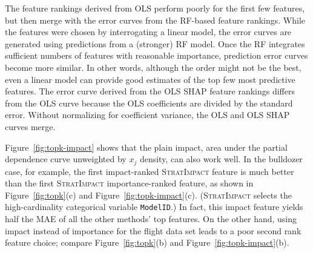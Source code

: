 \documentclass[11pt]{article}
\newcommand{\figref}[1]{Figure~\ref{#1}}
\newcommand{\simp}{\fontfamily{cmr}\textsc{\small StratImpact}}
\begin{document}
The feature rankings derived from OLS perform poorly for the first few features, but then merge with the error curves from the RF-based feature rankings.  While the features were chosen by interrogating a linear model, the error curves are generated using predictions from a (stronger) RF model. Once the RF integrates sufficient numbers of features with reasonable importance, prediction error curves become more similar.  In other words, although the order might not be the best, even a linear model can provide good estimates of the top few most  predictive features. The error curve derived from the OLS SHAP feature rankings differs from the OLS curve because the OLS coefficients are divided by the standard error. Without normalizing for coefficient variance, the OLS and OLS SHAP curves merge.

\figref{fig:topk-impact} shows that the plain impact, area under the partial dependence curve unweighted by $x_j$ density, can also work well.  In the bulldozer case, for example, the first impact-ranked \simp{} feature is much better than the first \simp{} importance-ranked feature, as shown in \figref{fig:topk}(c) and \figref{fig:topk-impact}(c). (\simp{} selects the high-cardinality categorical variable {\tt ModelID}.) In fact, this impact feature yields half the MAE of all the other methods' top features. On the other hand, using impact instead of importance for the flight data set leads to a poor second rank feature choice; compare \figref{fig:topk}(b) and \figref{fig:topk-impact}(b).
\end{document}
